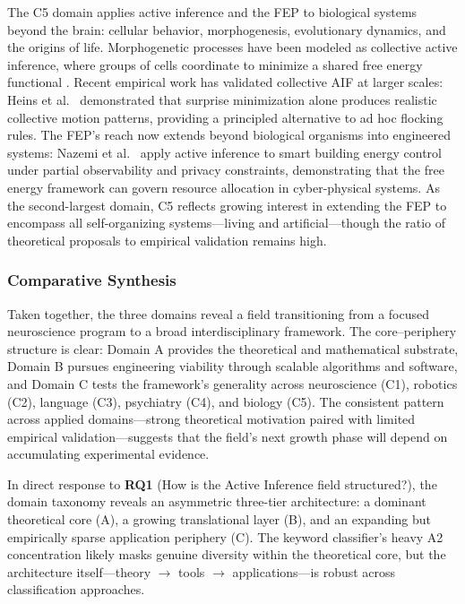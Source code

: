 \documentclass[
  english,
]{article}
\begin{document}
{{{{{{{{{{{{{{{{The C5 domain applies active inference and the FEP to biological systems
beyond the brain: cellular behavior, morphogenesis, evolutionary
dynamics, and the origins of life. Morphogenetic processes have been
modeled as collective active inference, where groups of cells coordinate
to minimize a shared free energy functional
\citep{kuchling2020morphogenesis, levin2022technological}. Recent
empirical work has validated collective AIF at larger scales: Heins et
al.~\citep{heins2024collective} demonstrated that surprise minimization
alone produces realistic collective motion patterns, providing a
principled alternative to ad hoc flocking rules. The FEP's reach now
extends beyond biological organisms into engineered systems: Nazemi et
al.~\citep{nazemi2025energy} apply active inference to smart building
energy control under partial observability and privacy constraints,
demonstrating that the free energy framework can govern resource
allocation in cyber-physical systems. As the second-largest domain, C5
reflects growing interest in extending the FEP to encompass all
self-organizing systems---living and artificial---though the ratio of
theoretical proposals to empirical validation remains high.

\subsubsection{Comparative Synthesis}\label{comparative-synthesis}

Taken together, the three domains reveal a field transitioning from a
focused neuroscience program to a broad interdisciplinary framework. The
core--periphery structure is clear: Domain A provides the theoretical
and mathematical substrate, Domain B pursues engineering viability
through scalable algorithms and software, and Domain C tests the
framework's generality across neuroscience (C1), robotics (C2), language
(C3), psychiatry (C4), and biology (C5). The consistent pattern across
applied domains---strong theoretical motivation paired with limited
empirical validation---suggests that the field's next growth phase will
depend on accumulating experimental evidence.

In direct response to \textbf{RQ1} (How is the Active Inference field
structured?), the domain taxonomy reveals an asymmetric three-tier
architecture: a dominant theoretical core (A), a growing translational
layer (B), and an expanding but empirically sparse application periphery
(C). The keyword classifier's heavy A2 concentration likely masks
genuine diversity within the theoretical core, but the architecture
itself---theory \texorpdfstring{\ensuremath{\to}}{->} tools \texorpdfstring{\ensuremath{\to}}{->} applications---is robust across classification
approaches.

}}}}}}}}}}}}}}}}
\end{document}
